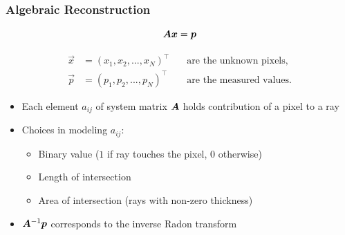 \begin{frame}
	\frametitle{Algebraic Reconstruction}

	\begin{equation}
		\label{eqn:ct_algebraic_1}
		\bm A\boldsymbol{x} = \boldsymbol{p}
	\end{equation}

	\begin{eqnarray*}
		\vec{x} &= (x_1, x_2,...,x_N)^\top &\quad \text{are the unknown pixels,} \\
		\vec{p} &= (p_1, p_2,...,p_N)^\top &\quad \text{are the measured values.}
	\end{eqnarray*}

	\begin{itemize}
		\item Each element $a_{ij}$ of system matrix $\bm A$ holds contribution of a pixel to a ray
		\item Choices in modeling $a_{ij}$:
		      \begin{itemize}
			      \item Binary value ($1$ if ray touches the pixel, $0$ otherwise)
			      \item Length of intersection
			      \item Area of intersection (rays with non-zero thickness)
		      \end{itemize}
		\item $\bm A^{-1} \boldsymbol{p}$ corresponds to the inverse Radon transform
	\end{itemize}
\end{frame}

